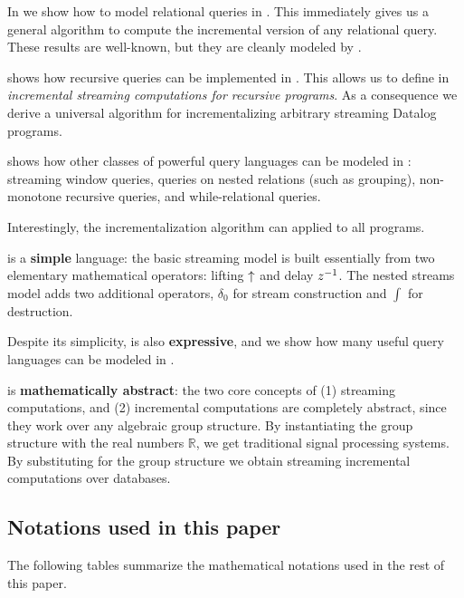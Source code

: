 In   
we show how to model relational queries in \dbsp.  This immediately gives
us a general algorithm to compute the incremental version of any relational query.
These results are well-known, but they are cleanly modeled by \dbsp.

 shows how recursive queries can be implemented in \dbsp.  
This allows us to define in  \emph{incremental streaming computations 
for recursive programs}.  As a consequence we derive a universal algorithm for incrementalizing
arbitrary streaming Datalog programs.

 shows how other classes of powerful query languages can
be modeled in \dbsp: streaming window queries, queries on nested relations (such as grouping),
non-monotone recursive queries, and while-relational queries. 

Interestingly, the incrementalization algorithm can applied to all \dbsp programs.

\dbsp is a \textbf{simple} language: 
the basic  \dbsp streaming model is built essentially from two elementary 
mathematical operators: lifting $\lift$ and delay $z^{-1}$.
The nested streams model adds two additional operators, $\delta_0$ for 
stream construction and $\int$ for destruction.

Despite its simplicity, \dbsp is also \textbf{expressive}, and we show how many useful
query languages can be modeled in \dbsp.

\dbsp is \textbf{mathematically abstract}: the two core concepts of 
(1) streaming computations, and (2) incremental computations
are completely abstract, since they work over any algebraic group structure.  
By instantiating the group structure with the real numbers $\mathbb{R}$, 
we get traditional signal processing systems.  By substituting
for the group structure \zrs we obtain streaming incremental computations over databases. 

\subsection{Notations used in this paper}

The following tables summarize the mathematical notations used in the rest of this paper.

